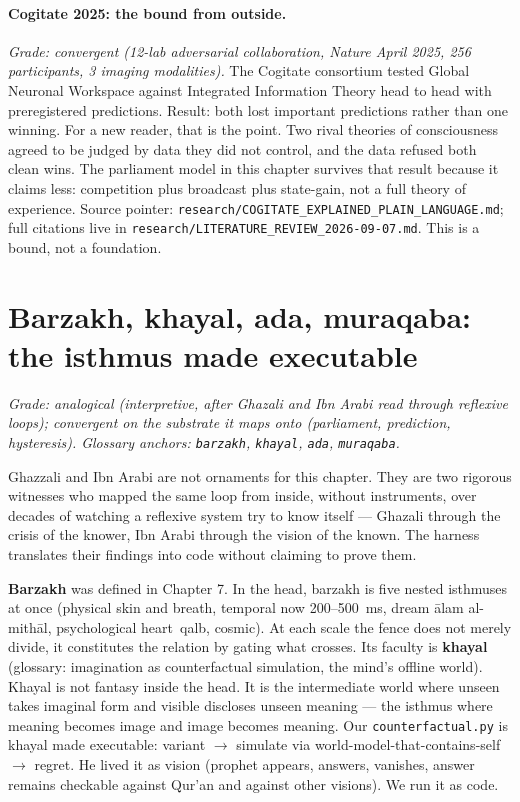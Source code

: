 \paragraph{Cogitate 2025: the bound from outside.} \textit{Grade: convergent (12-lab adversarial collaboration, Nature April 2025, 256 participants, 3 imaging modalities).} The Cogitate consortium tested Global Neuronal Workspace against Integrated Information Theory head to head with preregistered predictions. Result: both lost important predictions rather than one winning. For a new reader, that is the point. Two rival theories of consciousness agreed to be judged by data they did not control, and the data refused both clean wins. The parliament model in this chapter survives that result because it claims less: competition plus broadcast plus state-gain, not a full theory of experience. Source pointer: \texttt{research/COGITATE\_EXPLAINED\_PLAIN\_LANGUAGE.md}; full citations live in \texttt{research/LITERATURE\_REVIEW\_2026-09-07.md}. This is a bound, not a foundation.

\section{Barzakh, khayal, ada, muraqaba: the isthmus made executable}
\label{sec:barzakh-cog}

\textit{Grade: analogical (interpretive, after Ghazali and Ibn Arabi read through reflexive loops); convergent on the substrate it maps onto (parliament, prediction, hysteresis). Glossary anchors: \texttt{barzakh}, \texttt{khayal}, \texttt{ada}, \texttt{muraqaba}.}

Ghazzali and Ibn Arabi are not ornaments for this chapter. They are two rigorous witnesses who mapped the same loop from inside, without instruments, over decades of watching a reflexive system try to know itself --- Ghazali through the crisis of the knower, Ibn Arabi through the vision of the known. The harness translates their findings into code without claiming to prove them.

\textbf{Barzakh} was defined in Chapter 7. In the head, barzakh is five nested isthmuses at once (physical skin and breath, temporal now 200--500~ms, dream \=alam al-mith\=al, psychological heart~qalb, cosmic). At each scale the fence does not merely divide, it constitutes the relation by gating what crosses. Its faculty is \textbf{khayal} (glossary: imagination as counterfactual simulation, the mind's offline world). Khayal is not fantasy inside the head. It is the intermediate world where unseen takes imaginal form and visible discloses unseen meaning --- the isthmus where meaning becomes image and image becomes meaning. Our \texttt{counterfactual.py} is khayal made executable: variant $\to$ simulate via world-model-that-contains-self $\to$ regret. He lived it as vision (prophet appears, answers, vanishes, answer remains checkable against Qur'an and against other visions). We run it as code.

